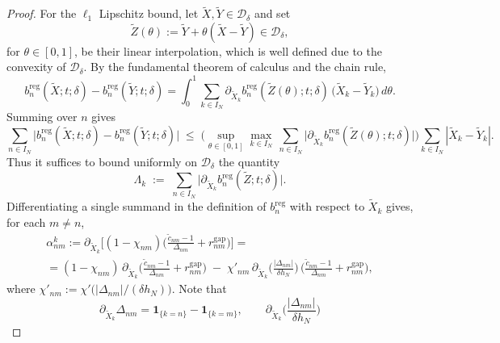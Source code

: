 \documentclass[10pt,a4paper]{amsart}
\begin{document}
\begin{proof}
For the $\ell_1$ Lipschitz bound, let $\widetilde X,\widetilde Y\in\mathcal D_\delta$ and set
\begin{equation}
\widetilde Z(\theta):=\widetilde Y+\theta(\widetilde X-\widetilde Y) \in \mathcal{D}_{\delta},
\end{equation} for
$\theta\in[0,1]$, be their linear interpolation, which is well defined due to the convexity of $\mathcal{D}_{\delta}$. By the fundamental theorem of calculus and the chain rule,
\begin{equation}
b^{\mathrm{reg}}_{n}(\widetilde X;t;\delta)-b^{\mathrm{reg}}_{n}(\widetilde Y;t;\delta)
=\int_0^1\sum_{k\in I_N}
\partial_{\widetilde X_k} b^{\mathrm{reg}}_{n}(\widetilde Z(\theta);t;\delta)\,
\big(\widetilde X_k-\widetilde Y_k\big)\,d\theta .
\end{equation}
Summing over $n$ gives
\begin{equation}\label{eq:FToC}
\sum_{n\in I_N}\big|b^{\mathrm{reg}}_{n}(\widetilde X;t;\delta)
-b^{\mathrm{reg}}_{n}(\widetilde Y;t;\delta)\big|
\;\le\; \Big(\sup_{\theta\in[0,1]}
\max_{k\in I_N}\,\sum_{n\in I_N}
\big|\partial_{\widetilde X_k} b^{\mathrm{reg}}_{n}(\widetilde Z(\theta);t;\delta)\big|\Big)
\sum_{k\in I_N}|\widetilde X_k-\widetilde Y_k|.
\end{equation}
Thus it suffices to bound uniformly on $\mathcal D_\delta$ the quantity
\begin{equation}
\Lambda_{k}\;:=\;\sum_{n\in I_N}
\big|\partial_{\widetilde X_k} b^{\mathrm{reg}}_{n}(\widetilde Z;t;\delta)\big|.
\end{equation}
\noindent
Differentiating a single summand in the definition of $b^{\mathrm{reg}}_{n}$ with
respect to $\widetilde X_k$ gives, for each $m\neq n$,
\begin{multline}\label{eq:def-alpha}
\alpha_{nm}^k
:=\partial_{\widetilde X_k}\!\Big[
(1-\chi_{nm})\Big(\frac{\widetilde c_{nm}-1}{\Delta_{nm}}
+ r^{\mathrm{gap}}_{nm}\Big)\Big]=\\
=(1-\chi_{nm})\,
\partial_{\widetilde X_k}\!\Big(\frac{\widetilde c_{nm}-1}{\Delta_{nm}}
+ r^{\mathrm{gap}}_{nm}\Big)
\;-\;\chi'_{nm}\,
\partial_{\widetilde X_k}\!\Big(\frac{|\Delta_{nm}|}{\delta h_N}\Big)\,
\Big(\frac{\widetilde c_{nm}-1}{\Delta_{nm}}+ r^{\mathrm{gap}}_{nm}\Big),
\end{multline}
where $\chi'_{nm}:=\chi'\!\big(|\Delta_{nm}|/(\delta h_N)\big)$.  Note that
\begin{equation}\label{eq:derivs-Delta}
\partial_{\widetilde X_k}\Delta_{nm}=\mathbf{1}_{\{k=n\}}-\mathbf{1}_{\{k=m\}},
\qquad
\partial_{\widetilde X_k}\!\Big(\frac{|\Delta_{nm}|}{\delta h_N}\Big)

\end{equation}
\end{proof}
\end{document}
